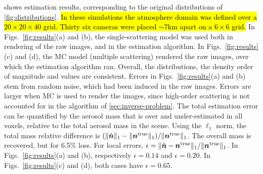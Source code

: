 \documentclass[10pt,letterpaper]{article}
\begin{document}
 shows estimation results, corresponding to the
original distributions of \cref{fig:distributions}. 
\hl{
In these simulations the atmosphere domain was defined over a
$20\times20 \times 40$ grid. Thirty six cameras were placed
$\sim7$km apart on a $6\times6$ grid.
}
In Figs.~\ref{fig:results}(a) and (b), the single-scattering model was
used both
in rendering of the raw images, and in the estimation algorithm. In
Figs.~\ref{fig:results}(c) and (d), the MC model (multiple scattering)
rendered the raw images, over which the estimation algorithm
ran. Overall, the distributions, the density order of magnitude and
values are consistent.
Errors in Figs.~\ref{fig:results}(a) and (b) stem from random noise, which had
been induced in the raw images. Errors are larger when MC is used to
render the images, since high-order scattering is not accounted for in
the algorithm of \cref{sec:inverse-problem}. The total estimation
error can be quantified by the aerosol mass that is over and under-estimated
in all voxels, relative to the total aerosol mass in the scene. Using the $\ell_1$ norm, 
the total mass relative difference is
$(\|\hat{\bm n}\|_1 - \|{\bm n}^{\rm true} \|_1) / \| {\bm n}^{\rm true} \|_1$.
The overall mass is recovered, but for 6.5\% loss. For local errors,
 $\epsilon=\|
\hat{\bm n} - {\bm n}^{\rm true} \|_1 / \| {\bm n}^{\rm true} \|_1$.
  In Figs.~\ref{fig:results}(a) and (b), respectively $\epsilon=0.14$ and
$\epsilon=0.20$.  In Figs.~\ref{fig:results}(c) and (d), both cases have
$\epsilon=0.65$.
\end{document}

